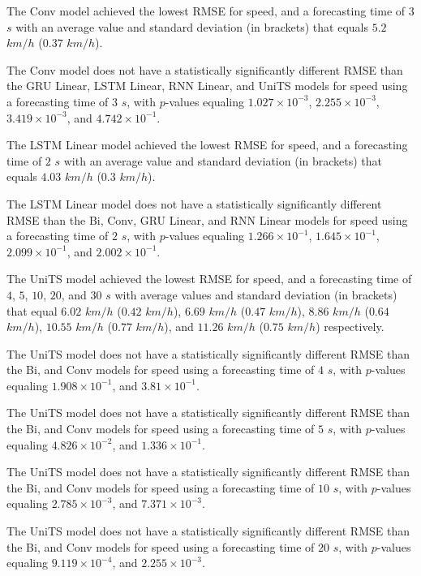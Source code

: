 The Conv model achieved the lowest RMSE for speed, and a forecasting time of $3$ $s$ with an average value and standard deviation (in brackets) that equals $5.2$ $km/h$ ($0.37$ $km/h$).

The Conv model does not have a statistically significantly different RMSE than the GRU Linear, LSTM Linear, RNN Linear, and UniTS models for speed using a forecasting time of $3$ $s$, with $p$-values equaling $1.027 \times 10^{-3}$, $2.255 \times 10^{-3}$, $3.419 \times 10^{-3}$, and $4.742 \times 10^{-1}$.

The LSTM Linear model achieved the lowest RMSE for speed, and a forecasting time of $2$ $s$ with an average value and standard deviation (in brackets) that equals $4.03$ $km/h$ ($0.3$ $km/h$).

The LSTM Linear model does not have a statistically significantly different RMSE than the Bi, Conv, GRU Linear, and RNN Linear models for speed using a forecasting time of $2$ $s$, with $p$-values equaling $1.266 \times 10^{-1}$, $1.645 \times 10^{-1}$, $2.099 \times 10^{-1}$, and $2.002 \times 10^{-1}$.

The UniTS model achieved the lowest RMSE for speed, and a forecasting time of $4$, $5$, $10$, $20$, and $30$ $s$ with average values and standard deviation (in brackets) that equal $6.02$ $km/h$ ($0.42$ $km/h$), $6.69$ $km/h$ ($0.47$ $km/h$), $8.86$ $km/h$ ($0.64$ $km/h$), $10.55$ $km/h$ ($0.77$ $km/h$), and $11.26$ $km/h$ ($0.75$ $km/h$) respectively.

The UniTS model does not have a statistically significantly different RMSE than the Bi, and Conv models for speed using a forecasting time of $4$ $s$, with $p$-values equaling $1.908 \times 10^{-1}$, and $3.81 \times 10^{-1}$.

The UniTS model does not have a statistically significantly different RMSE than the Bi, and Conv models for speed using a forecasting time of $5$ $s$, with $p$-values equaling $4.826 \times 10^{-2}$, and $1.336 \times 10^{-1}$.

The UniTS model does not have a statistically significantly different RMSE than the Bi, and Conv models for speed using a forecasting time of $10$ $s$, with $p$-values equaling $2.785 \times 10^{-3}$, and $7.371 \times 10^{-3}$.

The UniTS model does not have a statistically significantly different RMSE than the Bi, and Conv models for speed using a forecasting time of $20$ $s$, with $p$-values equaling $9.119 \times 10^{-4}$, and $2.255 \times 10^{-3}$.

